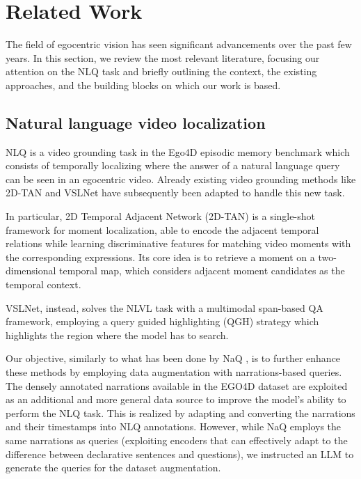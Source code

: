 \documentclass[10pt,twocolumn,letterpaper]{article}
\begin{document}
\section{Related Work}
The field of egocentric vision has seen significant advancements over the past few years. In this section, we review the most relevant literature, focusing our attention on the NLQ task and briefly outlining the context, the existing approaches, and the building blocks on which our work is based.
\subsection{Natural language video localization}
NLQ is a video grounding task in the Ego4D episodic memory benchmark which consists of temporally localizing where the answer of a natural language query can be seen in an egocentric video. 
Already existing video grounding methods like 2D-TAN \cite{zhang2020learning2dtemporaladjacent} and VSLNet \cite{zhang2020spanbasedlocalizingnetworknatural} have subsequently been adapted to handle this new task.

In particular, 2D Temporal Adjacent Network (2D-TAN) is a single-shot framework for moment localization, able to encode the adjacent temporal relations while learning discriminative features for matching video 
moments with the corresponding expressions. Its core idea is to retrieve a moment on a two-dimensional 
temporal map, which considers adjacent moment candidates as the temporal context.

VSLNet, instead, solves the NLVL task with a multimodal span-based QA framework, employing a query
guided highlighting (QGH) strategy which highlights the region where the model has to search.

Our objective, similarly to what has been done by NaQ \cite{ramakrishnan2023naqleveragingnarrationsqueries}, is to further enhance these methods by 
employing data augmentation with narrations-based queries. The densely annotated narrations available in 
the EGO4D dataset are exploited as an additional and more general data source to improve the model’s 
ability to perform the NLQ task. This is realized by adapting and converting the narrations and their 
timestamps into NLQ annotations.  
However, while NaQ employs the same narrations as queries (exploiting encoders that can effectively adapt 
to the difference between declarative sentences and questions), we instructed an LLM to generate the 
queries for the dataset augmentation.
\end{document}
